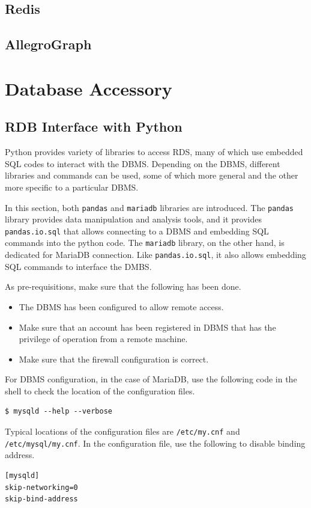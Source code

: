 \subsection{Redis}





\subsection{AllegroGraph}





\section{Database Accessory}

\subsection{RDB Interface with Python}

Python provides variety of libraries to access RDS, many of which use embedded SQL codes to interact with the DBMS. Depending on the DBMS, different libraries and commands can be used, some of which more general and the other more specific to a particular DBMS.

In this section, both \verb|pandas| and \verb|mariadb| libraries are introduced. The \verb|pandas| library provides data manipulation and analysis tools, and it provides \verb|pandas.io.sql| that allows connecting to a DBMS and embedding SQL commands into the python code. The \verb|mariadb| library, on the other hand, is dedicated for MariaDB connection. Like \verb|pandas.io.sql|, it also allows embedding SQL commands to interface the DMBS.

As pre-requisitions, make sure that the following has been done.
\begin{itemize}
	\item The DBMS has been configured to allow remote access.
	\item Make sure that an account has been registered in DBMS that has the privilege of operation from a remote machine.
	\item Make sure that the firewall configuration is correct.
\end{itemize}

For DBMS configuration, in the case of MariaDB, use the following code in the shell to check the location of the configuration files.
\begin{lstlisting}
$ mysqld --help --verbose
\end{lstlisting}
Typical locations of the configuration files are \verb|/etc/my.cnf| and \verb|/etc/mysql/my.cnf|. In the configuration file, use the following to disable binding address.
\begin{lstlisting}
[mysqld]
skip-networking=0
skip-bind-address
\end{lstlisting}

